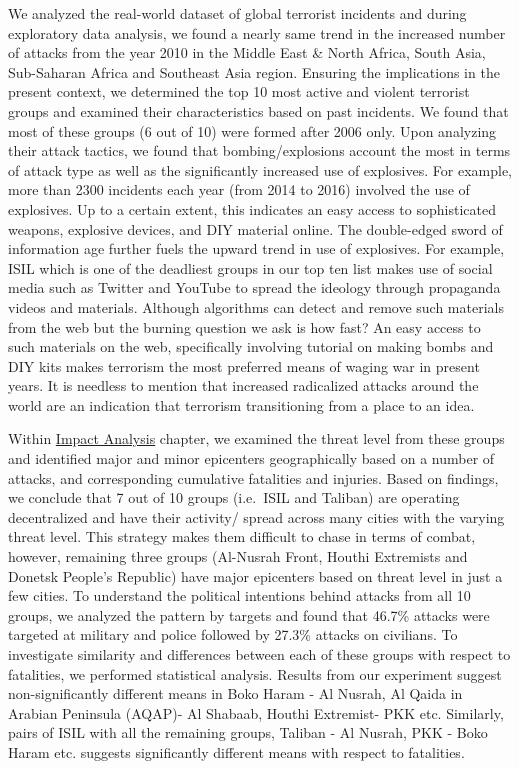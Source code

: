 \documentclass[11pt,oneside,a4paper]{reedthesis}
\begin{document}
We analyzed the real-world dataset of global terrorist incidents and
during exploratory data analysis, we found a nearly same trend in the
increased number of attacks from the year 2010 in the Middle East \&
North Africa, South Asia, Sub-Saharan Africa and Southeast Asia region.
Ensuring the implications in the present context, we determined the top
10 most active and violent terrorist groups and examined their
characteristics based on past incidents. We found that most of these
groups (6 out of 10) were formed after 2006 only. Upon analyzing their
attack tactics, we found that bombing/explosions account the most in
terms of attack type as well as the significantly increased use of
explosives. For example, more than 2300 incidents each year (from 2014
to 2016) involved the use of explosives. Up to a certain extent, this
indicates an easy access to sophisticated weapons, explosive devices,
and DIY material online. The double-edged sword of information age
further fuels the upward trend in use of explosives. For example, ISIL
which is one of the deadliest groups in our top ten list makes use of
social media such as Twitter and YouTube to spread the ideology through
propaganda videos and materials. Although algorithms can detect and
remove such materials from the web but the burning question we ask is
how fast? An easy access to such materials on the web, specifically
involving tutorial on making bombs and DIY kits makes terrorism the most
preferred means of waging war in present years. It is needless to
mention that increased radicalized attacks around the world are an
indication that terrorism transitioning from a place to an idea.

Within \protect\hyperlink{impact-analysis}{Impact Analysis} chapter, we
examined the threat level from these groups and identified major and
minor epicenters geographically based on a number of attacks, and
corresponding cumulative fatalities and injuries. Based on findings, we
conclude that 7 out of 10 groups (i.e.~ISIL and Taliban) are operating
decentralized and have their activity/ spread across many cities with
the varying threat level. This strategy makes them difficult to chase in
terms of combat, however, remaining three groups (Al-Nusrah Front,
Houthi Extremists and Donetsk People's Republic) have major epicenters
based on threat level in just a few cities. To understand the political
intentions behind attacks from all 10 groups, we analyzed the pattern by
targets and found that 46.7\% attacks were targeted at military and
police followed by 27.3\% attacks on civilians. To investigate
similarity and differences between each of these groups with respect to
fatalities, we performed statistical analysis. Results from our
experiment suggest non-significantly different means in Boko Haram - Al
Nusrah, Al Qaida in Arabian Peninsula (AQAP)- Al Shabaab, Houthi
Extremist- PKK etc. Similarly, pairs of ISIL with all the remaining
groups, Taliban - Al Nusrah, PKK - Boko Haram etc. suggests
significantly different means with respect to fatalities.
\end{document}
